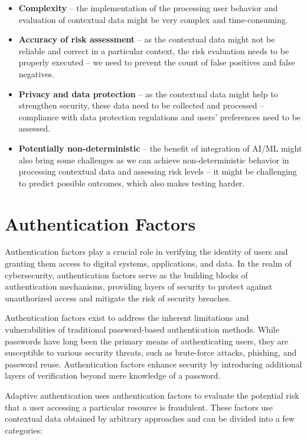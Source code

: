 \begin{itemize}
    \item \textbf{Complexity} -- the implementation of the processing user behavior and evaluation of contextual data might be very complex and time-consuming.  
    \item \textbf{Accuracy of risk assessment} -- as the contextual data might not be reliable and correct in a particular context, the risk evaluation needs to be properly executed -- we need to prevent the count of false positives and false negatives. 
    \item \textbf{Privacy and data protection} -- as the contextual data might help to strengthen security, these data need to be collected and processed -- compliance with data protection regulations and users' preferences need to be assessed.
    \item \textbf{Potentially non-deterministic} -- the benefit of integration of AI/ML might also bring some challenges as we can achieve non-deterministic behavior in processing contextual data and assessing risk levels -- it might be challenging to predict possible outcomes, which also makes testing harder.\cite{intro-logintc,intro-silverfort,intro-descope}
    
\end{itemize}

\section{Authentication Factors} \label{authentication-factors}
Authentication factors play a crucial role in verifying the identity of users and granting them access to digital systems, applications, and data.
In the realm of cybersecurity, authentication factors serve as the building blocks of authentication mechanisms, providing layers of security to protect against unauthorized access and mitigate the risk of security breaches.

Authentication factors exist to address the inherent limitations and vulnerabilities of traditional password-based authentication methods.
While passwords have long been the primary means of authenticating users, they are susceptible to various security threats, such as brute-force attacks, phishing, and password reuse.
Authentication factors enhance security by introducing additional layers of verification beyond mere knowledge of a password.\cite{auth-factors-aratek}

Adaptive authentication uses authentication factors to evaluate the potential risk that a user accessing a particular resource is fraudulent.
\newline
\newline
These factors use contextual data obtained by arbitrary approaches and can be divided into a few categories:

